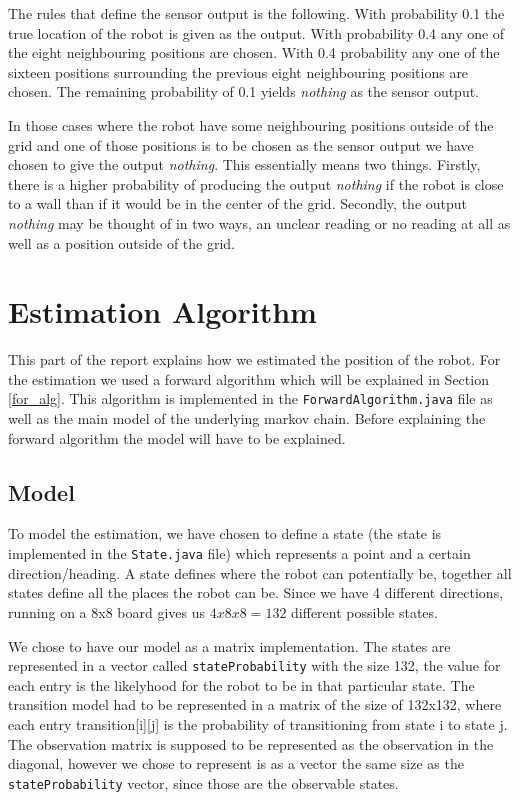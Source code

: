 \documentclass[a4paper]{article}
\begin{document}
The rules that define the sensor output is the following. With probability 0.1 the true location of the robot is given as the output. With probability 0.4 any one of the eight neighbouring positions are chosen. With 0.4 probability any one of the sixteen positions surrounding the previous eight neighbouring positions are chosen. The remaining probability of 0.1 yields \emph{nothing} as the sensor output.

In those cases where the robot have some neighbouring positions outside of the grid and one of those positions is to be chosen as the sensor output we have chosen to give the output \emph{nothing}. This essentially means two things.  Firstly, there is a higher probability of producing the output \emph{nothing} if the robot is close to a wall than if it would be in the center of the grid. Secondly, the output \emph{nothing} may be thought of in two ways, an unclear reading or no reading at all as well as a position outside of the grid.




\section{Estimation Algorithm}
This part of the report explains how we estimated the position of the robot.
For the estimation we used a forward algorithm which will be explained in Section \ref{for_alg}. This algorithm is implemented in the \texttt{ForwardAlgorithm.java} file as well as the main model of the underlying markov chain. Before explaining the forward algorithm the model will have to be explained.

\subsection{Model}
To model the estimation, we have chosen to define a state (the state is implemented in the \texttt{State.java} file) which represents a point and a certain direction/heading. A state defines where the robot can potentially be, together all states define all the places the robot can be. Since we have 4 different directions, running on a 8x8 board gives us $4x8x8 = 132$ different possible states.

We chose to have our model as a matrix implementation. The states are represented in a vector called \texttt{stateProbability} with the size 132, the value for each entry is the likelyhood for the robot to be in that particular state. The transition model had to be represented in a matrix of the size of 132x132, where each entry transition[i][j] is the probability of transitioning from state i to state j.
The observation matrix is supposed to be represented as the observation in the diagonal, however we chose to represent is as a vector the same size as the \texttt{stateProbability} vector, since those are the observable states.
\end{document}
